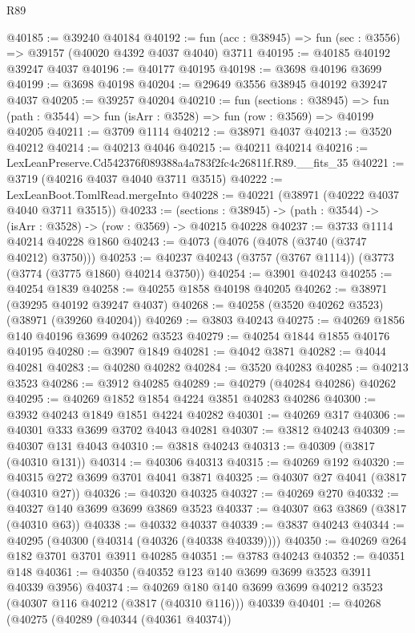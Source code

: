\begin{lexlean}{R89}
\begin{coremodule}
@40185 := @39240 @40184
@40192 := fun (acc : @38945) => fun (sec : @3556) => @39157 (@40020 @4392 @4037 @4040) @3711
@40195 := @40185 @40192 @39247 @4037
@40196 := @40177 @40195
@40198 := @3698 @40196 @3699
@40199 := @3698 @40198
@40204 := @29649 @3556 @38945 @40192 @39247 @4037
@40205 := @39257 @40204
@40210 := fun (sections : @38945) =>
  fun (path : @3544) => fun (isArr : @3528) => fun (row : @3569) => @40199 @40205
@40211 := @3709 @1114
@40212 := @38971 @4037
@40213 := @3520 @40212
@40214 := @40213 @4046
@40215 := @40211 @40214
@40216 := LexLeanPreserve.Cd542376f089388a4a783f2fc4c26811f.R89.__fits_35
@40221 := @3719 (@40216 @4037 @4040 @3711 @3515)
@40222 := LexLeanBoot.TomlRead.mergeInto
@40228 := @40221 (@38971 (@40222 @4037 @4040 @3711 @3515))
@40233 := (sections : @38945) -> (path : @3544) -> (isArr : @3528) -> (row : @3569) -> @40215 @40228
@40237 := @3733 @1114 @40214 @40228 @1860
@40243 := @4073 (@4076 (@4078 (@3740 (@3747 @40212) @3750)))
@40253 := @40237 @40243 (@3757 (@3767 @1114)) (@3773 (@3774 (@3775 @1860) @40214 @3750))
@40254 := @3901 @40243
@40255 := @40254 @1839
@40258 := @40255 @1858 @40198 @40205
@40262 := @38971 (@39295 @40192 @39247 @4037)
@40268 := @40258 (@3520 @40262 @3523) (@38971 (@39260 @40204))
@40269 := @3803 @40243
@40275 := @40269 @1856 @140 @40196 @3699 @40262 @3523
@40279 := @40254 @1844 @1855 @40176 @40195
@40280 := @3907 @1849
@40281 := @4042 @3871
@40282 := @4044 @40281
@40283 := @40280 @40282
@40284 := @3520 @40283
@40285 := @40213 @3523
@40286 := @3912 @40285
@40289 := @40279 (@40284 @40286) @40262
@40295 := @40269 @1852 @1854 @4224 @3851 @40283 @40286
@40300 := @3932 @40243 @1849 @1851 @4224 @40282
@40301 := @40269 @317
@40306 := @40301 @333 @3699 @3702 @4043 @40281
@40307 := @3812 @40243
@40309 := @40307 @131 @4043
@40310 := @3818 @40243
@40313 := @40309 (@3817 (@40310 @131))
@40314 := @40306 @40313
@40315 := @40269 @192
@40320 := @40315 @272 @3699 @3701 @4041 @3871
@40325 := @40307 @27 @4041 (@3817 (@40310 @27))
@40326 := @40320 @40325
@40327 := @40269 @270
@40332 := @40327 @140 @3699 @3699 @3869 @3523
@40337 := @40307 @63 @3869 (@3817 (@40310 @63))
@40338 := @40332 @40337
@40339 := @3837 @40243
@40344 := @40295 (@40300 (@40314 (@40326 (@40338 @40339))))
@40350 := @40269 @264 @182 @3701 @3701 @3911 @40285
@40351 := @3783 @40243
@40352 := @40351 @148
@40361 := @40350 (@40352 @123 @140 @3699 @3699 @3523 @3911 @40339 @3956)
@40374 := @40269
    @180
    @140
    @3699
    @3699
    @40212
    @3523
    (@40307 @116 @40212 (@3817 (@40310 @116)))
    @40339
@40401 := @40268
    (@40275
      (@40289
        (@40344 (@40361 @40374))

\end{coremodule}
\end{lexlean}
